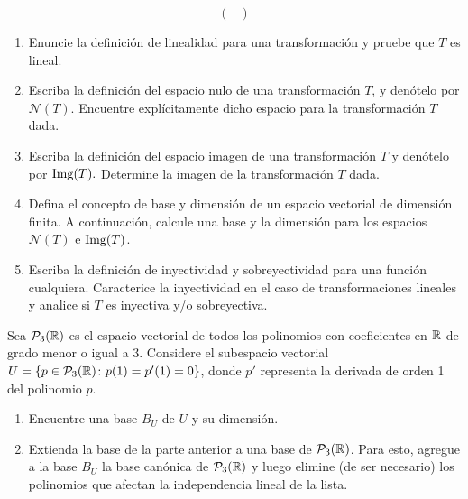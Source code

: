 \documentclass[10pt,respuestas,a4]{examenEPN}
\begin{document}
\begin{preguntas}
\[\begin{pmatrix}
\end{pmatrix}
\]
\begin{enumerate}
    \item Enuncie la definición de linealidad para una transformación y pruebe que $T$ es lineal.
    \item Escriba la definición del espacio nulo de una transformación $T$, y denótelo por $\mathcal N(T).$ Encuentre explícitamente dicho espacio para la transformación $T$ dada.
    \item Escriba la definición del espacio imagen de una transformación $T$ y denótelo por $\operatorname{Img}(T).$ Determine la imagen de la transformación $T$ dada.     
    \item Defina el concepto de base y dimensión de un espacio vectorial de dimensión finita. A continuación, calcule una base y la dimensión para los espacios $\mathcal N(T)$ e $\operatorname{Img}(T)$. 
    \item Escriba la definición de inyectividad y sobreyectividad para una función cualquiera. Caracterice la inyectividad en el caso de transformaciones lineales y analice si $T$ es inyectiva y/o sobreyectiva.
\end{enumerate}
\item Sea $\mathcal P_3(\mathbb{R})$ es el espacio vectorial de todos los polinomios con coeficientes en $\mathbb{R}$ de grado menor o igual a 3. Considere el subespacio vectorial  $U=\left\{ p\in \mathcal P_3(\mathbb{R})\colon p(1)=p'(1)=0\right\}$, donde $p'$ representa la derivada de orden 1 del polinomio $p.$
\begin{enumerate}
    \item Encuentre una base $B_U$ de $U$ y su dimensión.
    \item Extienda la base de la parte anterior a una base de $\mathcal P_3(\mathbb{R})$. Para esto, agregue a la base $B_U$ la base canónica de $\mathcal P_3(\mathbb{R})$ y luego elimine (de ser necesario) los polinomios que afectan la independencia  lineal de la lista.
 \end{enumerate}
\final
 \end{preguntas}
\end{document}
